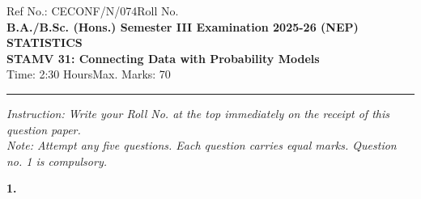\documentclass[11pt,a4paper]{article}
\begin{document}
\begin{center}
  \small Ref No.: CECONF/N/074\hfill Roll No. \underline{\hspace{4cm}}\\[6pt]
  {\large\bfseries B.A./B.Sc. (Hons.) Semester III Examination 2025-26 (NEP)}\\[4pt]
  {\large\bfseries STATISTICS}\\[4pt]
  {\large\bfseries STAMV 31: Connecting Data with Probability Models}\\[4pt]
  {\normalsize Time: 2:30 Hours\hfill Max. Marks: 70}
\end{center}

\rule{\linewidth}{0.4pt}\smallskip



\noindent   \textit{Instruction: Write your Roll No. at the top immediately on the receipt of this question paper.}\\[2pt]



\noindent   \textit{Note: Attempt any five questions. Each question carries equal marks. Question no. 1 is compulsory.}
\bigskip




\noindent   \textbf{1.}
\end{document}
